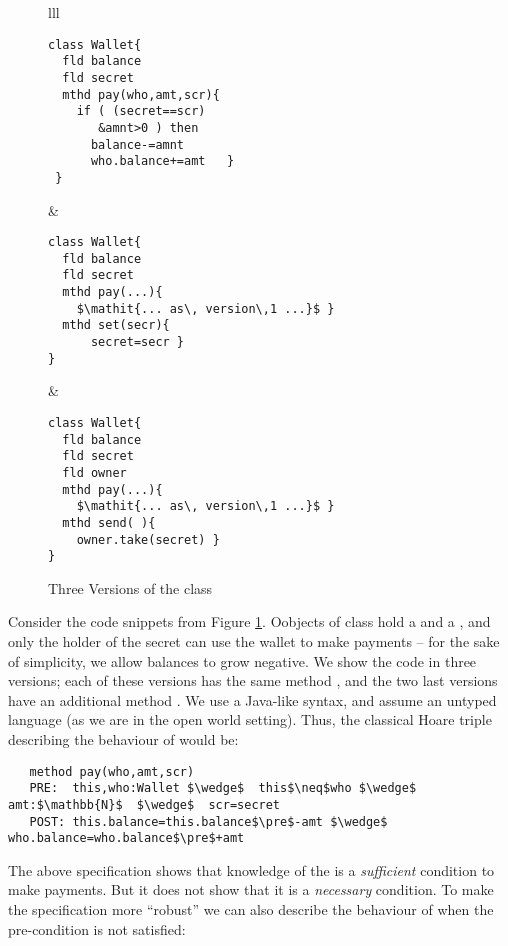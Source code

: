  \begin{figure}[htb]
 \begin{tabular}{lll}
\begin{minipage}{0.39\textwidth}
\begin{lstlisting}
class Wallet{
  fld balance 
  fld secret 
  mthd pay(who,amt,scr){
    if ( (secret==scr)
       &amnt>0 ) then 
      balance-=amnt
      who.balance+=amt   }
 }
\end{lstlisting}
\end{minipage}
  & 
\begin{minipage}{0.29\textwidth}
\begin{lstlisting}
class Wallet{
  fld balance  
  fld secret  
  mthd pay(...){
    $\mathit{... as\, version\,1 ...}$ }
  mthd set(secr){
      secret=secr }
}
\end{lstlisting}
\end{minipage} &  
\begin{minipage}{0.32\textwidth}
\begin{lstlisting}
class Wallet{
  fld balance  
  fld secret  
  fld owner  
  mthd pay(...){
    $\mathit{... as\, version\,1 ...}$ }
  mthd send( ){
    owner.take(secret) }  
}
\end{lstlisting}
  \end{minipage}
 \end{tabular}
  \vspace*{-0.95cm}
  \caption{Three Versions of the class }
 \label{fig:ExampleWallet}
 \end{figure}

Consider the code snippets from Figure \ref{fig:ExampleWallet}. Oobjects of
 class   hold a  and a , and  only the holder of the secret can use the wallet to
 make payments
 -- for the sake of simplicity, we allow   balances to grow negative.
 We show the code in three versions; each of these versions has the same method , and the two last versions
 have an additional method .
  We use a Java-like syntax, and assume an untyped language (as we are in the open world setting).
 Thus, the classical Hoare triple describing the behaviour of  would be:
 
\begin{lstlisting}
   method pay(who,amt,scr)
   PRE:  this,who:Wallet $\wedge$  this$\neq$who $\wedge$ amt:$\mathbb{N}$  $\wedge$  scr=secret   
   POST: this.balance=this.balance$\pre$-amt $\wedge$ who.balance=who.balance$\pre$+amt 
 \end{lstlisting}
\vspace{-.2in}
The above specification shows that knowledge of the  is a \emph{sufficient} condition to make payments. 
But it does not show that it is a \emph{necessary} condition. To make the specification  
  more ``robust'' we can also describe the behaviour of     when the pre-condition is not satisfied:

